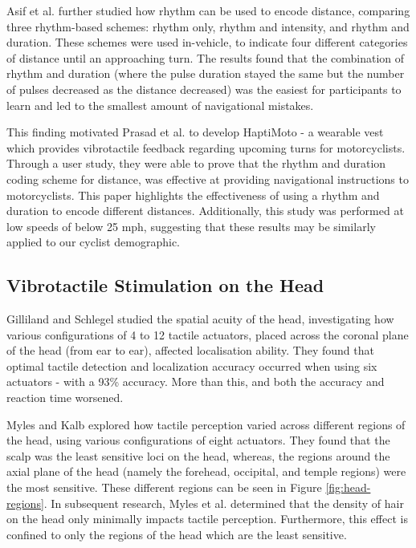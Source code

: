 \documentclass{mpaper}
\begin{document}
Asif et al. \cite{10.1145/1868914.1868923} further studied how rhythm can be used to encode distance, comparing three rhythm-based schemes: rhythm only, rhythm and intensity, and rhythm and duration. These schemes were used in-vehicle, to indicate four different categories of distance until an approaching turn. The results found that the combination of rhythm and duration (where the pulse duration stayed the same but the number of pulses decreased as the distance decreased) was the easiest for participants to learn and led to the smallest amount of navigational mistakes. 

This finding motivated Prasad et al. \cite{10.1145/2556288.2557404} to develop HaptiMoto - a wearable vest which provides vibrotactile feedback regarding upcoming turns for motorcyclists. Through a user study, they were able to prove that the rhythm and duration coding scheme for distance, was effective at providing navigational instructions to motorcyclists. This paper highlights the effectiveness of using a rhythm and duration to encode different distances. Additionally, this study was performed at low speeds of below 25 mph, suggesting that these results may be similarly applied to our cyclist demographic.



\subsection{Vibrotactile Stimulation on the Head}
Gilliland and Schlegel \cite{doi:10.1177/001872089403600410} studied the spatial acuity of the head, investigating how various configurations of 4 to 12 tactile actuators, placed across the coronal plane of the head (from ear to ear), affected localisation ability. They found that optimal tactile detection and localization accuracy occurred when using six actuators - with a 93\% accuracy. More than this, and both the accuracy and reaction time worsened. 

Myles and Kalb \cite{headguidelines} explored how tactile perception varied across different regions of the head, using various configurations of eight actuators. They found that the scalp was the least sensitive loci on the head, whereas, the regions around the axial plane of the head (namely the forehead, occipital, and temple regions) were the most sensitive. These different regions can be seen in Figure \ref{fig:head-regions}. In subsequent research, Myles et al. \cite{MYLES2015177} determined that the density of hair on the head only minimally impacts tactile perception. Furthermore, this effect is confined to only the regions of the head which are the least sensitive.
\end{document}
